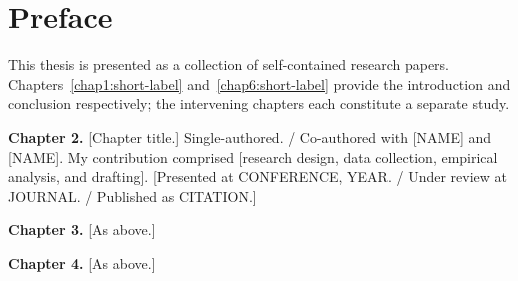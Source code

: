 %
%
%
%
\chapter*{Preface}

This thesis is presented as a collection of self-contained research
papers. Chapters~\ref{chap1:short-label} and~\ref{chap6:short-label}
provide the introduction and conclusion respectively; the intervening
chapters each constitute a separate study.

\vspace{0.5\baselineskip}
\noindent\textbf{Chapter 2.} [Chapter title.] Single-authored. /
Co-authored with [NAME] and [NAME]. My contribution comprised
[research design, data collection, empirical analysis, and drafting].
[Presented at CONFERENCE, YEAR. / Under review at JOURNAL. / Published
as CITATION.]

\vspace{0.5\baselineskip}
\noindent\textbf{Chapter 3.} [As above.]

\vspace{0.5\baselineskip}
\noindent\textbf{Chapter 4.} [As above.]

\clearpage
